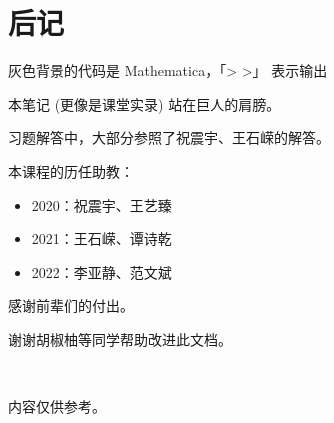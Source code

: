 \section{后记}

灰色背景的代码是 Mathematica，「> >」 表示输出

本笔记 (更像是课堂实录) 站在巨人的肩膀。

习题解答中，大部分参照了祝震宇、王石嵘的解答。

本课程的历任助教：
\begin{itemize}
    \item 2020：祝震宇、王艺臻
    \item 2021：王石嵘、谭诗乾
    \item 2022：李亚静、范文斌
\end{itemize}

感谢前辈们的付出。

谢谢胡椒柚等同学帮助改进此文档。

~

内容仅供参考。
